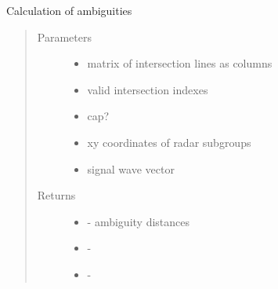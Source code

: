 \documentclass[letterpaper,12pt,english]{sphinxmanual}
\begin{document}
\begin{fulllineitems}
\label{\detokenize{functions:functions.explicit}}
Calculation of ambiguities
\begin{quote}\begin{description}
\item[{Parameters}] \leavevmode\begin{itemize}
\item {} 
 \textendash{} matrix of intersection lines as columns

\item {} 
 \textendash{} valid intersection indexes

\item {} 
 \textendash{} cap?

\item {} 
 \textendash{} xy coordinates of radar subgroups

\item {} 
 \textendash{} signal wave vector

\end{itemize}

\item[{Returns}] \leavevmode
\begin{itemize}
\item {} 
 - ambiguity distances

\item {} 
 -

\item {} 
 -

\end{itemize}


\end{description}\end{quote}

\end{fulllineitems}

\end{document}
